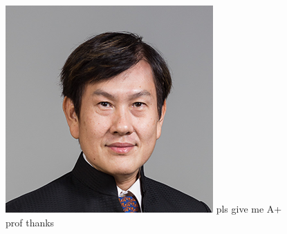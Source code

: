 \documentclass[10pt, portrait]{article}
\begin{document}
\begin{figure}
    \centering
    \includegraphics[width=\textwidth]{tantc.jpg}
    pls give me A+ prof thanks
\end{figure}
\end{document}
